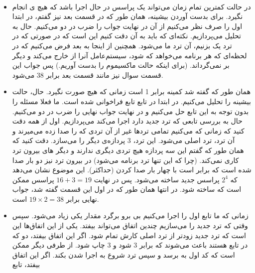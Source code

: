 \\
\noindent
\begin{itemize}
    \item در حالت کمترین تمام زمان می‌تواند یک پراسس در حال اجرا باشد که هیچ
    ی
    انجام نگیرد.
    برای بدست آوردن بیشینه، همان طور که در قسمت بعد نیز گفتم، در ابتدا
    اول را صرف نظر می‌کنیم از آن در نهایت جواب را ضرب در دو می‌کنیم.
    حال به تحلیل  می‌پردازیم.
    نکته‌ای که باید به آن دقت کنیم این است که در صورتی که در ترد یک
    بزنیم، آن ترد
    ما می‌شود. همچنین از اینجا به بعد فرض می‌کنیم که در لحظه‌ای که هر برنامه می‌خواهد که
    شود، سیستم‌عامل آنرا از
    خارج می‌کند و دیگر بر نمی‌گرداند. (برای اینکه حالت ماکسیموم را بدست آوریم.)
    پس جواب این قسمت سوال نیز مانند قسمت بعد برابر 38 می‌شود.
    \item همان طور که گفته شد کمینه برابر 1 است زمانی که هیچ  صورت نگیرد.
    حال، حالت بیشینه را تحلیل می‌کنیم. در ابتدا در تابع
    تابع
    فراخوانی شده است. ما فعلا مسئله را بدون توجه به این تابع حل می‌کنیم و در نهایت جواب نهایی را ضرب در
    دو می‌کنیم.
    حال به بررسی تابعی که ترد جدید دارد اجرا می‌کند می‌پردازیم. اول از همه دقت کنید که زمانی که
    می‌کنیم تمامی ترد‌ها غیر از آن تردی که
    را صدا زده می‌میرند و آن ترد، ترد اصلی می‌شود. این ترد، 3 پردازه‌ی دیگر را می‌سازد. دقت کنید که همان
    طور که گفتم این سه پردازه هیچ تردی دیگری ندارند و دیگر
    های
    بیرون ترد کاری نمی‌کند. (چرا که این تنها ترد برنامه می‌شود)
    در بیرون ترد نیز دو بار
    صدا شده است که برابر است با چهار بار صدا کردن
    (حداکثر).
    این موضوع نشان می‌دهد که
    $2^4$
    پراسس جدید ساخته می‌شود. پس در نهایت
    $16+3=19$
    پراسس ممکن است که ساخته شود. در انتها همان طور که در اول این قسمت گفته شد، جواب نهایی برابر
    $19 \times 2 = 38$
    است.
    \item زمانی که ما تابع
    اول را اجرا می‌کنیم بی برو برگرد مقدار
    یکی زیاد می‌شود. سپس وقتی که ترد جدید را می‌سازیم چندین اتفاق می‌تواند بیفتد.
    یکی از این اتفاق‌ها این است که ترد جدید زودتر از ترد اصلی کارش تمام شود. اگر این اتفاق بیفتد، دو
    که در تابع
    هستند باعث می‌شوند که
    برابر 3 شود و 3 چاپ شود.
    از طرفی دیگر ممکن است که کد اول به
    برسد و سپس ترد شروع به اجرا شدن بکند. اگر این اتفاق بیفتد، تابع

\end{itemize}
